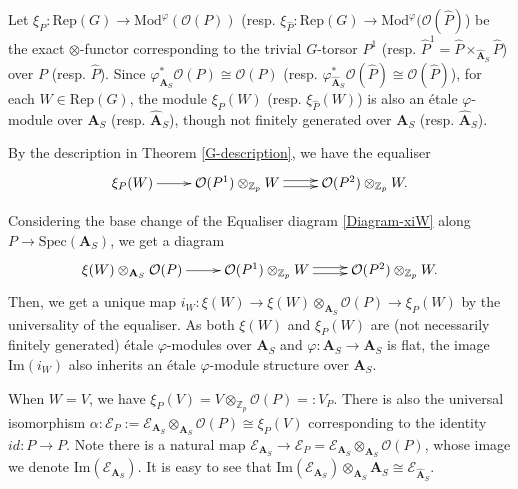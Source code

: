 \documentclass[10pt]{article}
\numberwithin{equation}{section}
\newcommand{\bZ}{{\mathbb Z}}
\newcommand{\calE}{{\mathcal E}}
\newcommand{\calF}{{\mathcal F}}
\newcommand{\calO}{{\mathcal O}}
\newcommand{\Ima}{{\mathrm{Im}}}            %
\newcommand{\Isom}{{\mathrm{Isom}}}         %
\newcommand{\Mod}{{\mathrm{Mod}}}           %
\newcommand{\Rep}{{\mathrm{Rep}}}           %
\newcommand{\Spec}{{\mathrm{Spec}}}         %
\newcommand{\bfA}{{\textbf{A}}}
\begin{document}

Let $\xi_P:\Rep(G)\to \Mod^{\varphi}(\calO(P))$ (resp. $\xi_{\widehat P}:\Rep(G)\to \Mod^{\varphi}(\calO(\widehat P)$) be the exact $\otimes$-functor corresponding to the trivial $G$-torsor $P^1$ (resp. $\widehat P^1=\widehat P\times_{\widehat\bfA_S}\widehat P$) over $P$ (resp. $\widehat P$). Since $\varphi^*_{\bfA_S}\calO(P)\cong \calO(P)$ (resp. $\varphi^*_{\widehat \bfA_S}\calO(\widehat P)\cong \calO(\widehat P)$), for each $W\in \Rep(G)$, the module $\xi_P(W)$ (resp. $\xi_{\widehat P}(W)$) is also an \'etale $\varphi$-module over $\bfA_S$ (resp. $\widehat\bfA_S$), though not finitely generated over $\bfA_S$ (resp. $\widehat\bfA_S$). 

By the description in Theorem \ref{G-description}, we have the equaliser
\begin{equation}
    \xymatrix{
    \xi_P(W)\ar[r]& \calO(P^1)\otimes_{\bZ_p}W\ar@<.5ex>[r]\ar@<-.5ex>[r] &\calO(P^2)\otimes_{\bZ_p}W.
    }
\end{equation}



Considering the base change of the Equaliser diagram \ref{Diagram-xiW}  along $P\to \Spec(\bfA_S)$, we get a diagram
\begin{equation}
    \xymatrix{
    \xi(W)\otimes_{\bfA_S}\calO(P)\ar[r]& \calO(P^1)\otimes_{\bZ_p}W\ar@<.5ex>[r]\ar@<-.5ex>[r]&\calO(P^2)\otimes_{\bZ_p}W.
    }
\end{equation}
Then, we get a unique map $i_W:\xi(W)\to \xi(W)\otimes_{\bfA_S}\calO(P)\to \xi_P(W)$  by the universality of the equaliser.  As both $\xi(W)$ and $\xi_P(W)$ are (not necessarily finitely generated) \'etale $\varphi$-modules over $\bfA_S$ and $\varphi:\bfA_S\to \bfA_S$ is flat, the image $\Ima(i_W)$ also inherits an \'etale $\varphi$-module structure over $\bfA_S$.




When $W=V$, we have $\xi_P(V)=V\otimes_{\bZ_p}\calO(P)=:V_P$. There is also the universal isomorphism $\alpha:\calE_P:=\calE_{\bfA_S}\otimes_{\bfA_S}\calO(P)\cong\xi_P(V)$ corresponding to the identity $id: P\to P$. Note there is a natural map $\calE_{\bfA_S}\to \calE_P=\calE_{\bfA_S}\otimes_{\bfA_S}\calO(P)$, whose image we denote $\Ima(\calE_{\bfA_S})$. It is easy to see that $\Ima(\calE_{\bfA_S})\otimes_{\bfA_S}\widehat\bfA_S\cong \calE_{\widehat\bfA_S}$.
\end{document}
